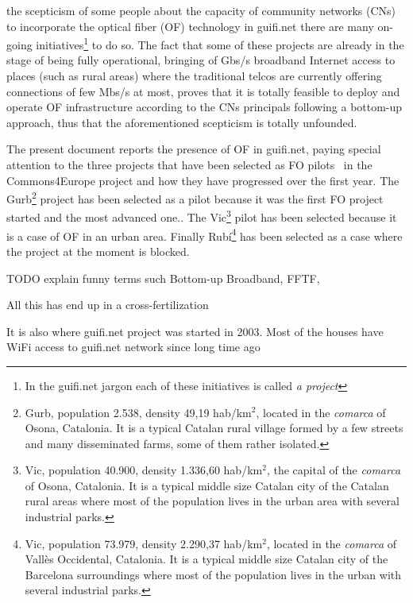  the scepticism of some people about the capacity of community networks (CNs) to incorporate the optical fiber (OF) technology in guifi.net there are many on-going initiatives\footnote{In the guifi.net jargon each of these initiatives is called \emph{a project}} to do so. The fact that some of these projects are already in the stage of being fully operational, bringing of Gbs/s broadband Internet access to places (such as rural areas) where the traditional telcos are currently offering connections of few Mbs/s at most, proves that it is totally feasible to deploy and operate OF infrastructure according to the CNs principals following a bottom-up approach, thus that the aforementioned scepticism is totally unfounded.

The present document reports the presence of OF in guifi.net, paying special attention to the three projects that have been selected as FO pilots~\cite{barcelo2012bub} in the Commons4Europe project and how they have progressed over the first year. The Gurb\footnote{Gurb, population 2.538, density 49,19 hab/km$^{2}$, located in the \emph{comarca} of Osona, Catalonia. It is a typical Catalan rural village formed by a few streets and many disseminated farms, some of them rather isolated.} project has been selected as a pilot because it was the first FO project started and the most advanced one.. The Vic\footnote{Vic, population 40.900, density 1.336,60 hab/km$^{2}$, the capital of the \emph{comarca} of Osona, Catalonia. It is a typical middle size Catalan city of the Catalan rural areas where most of the population lives in the urban area with several industrial parks.} pilot has been selected because it is a case of OF in an urban area. Finally Rub\'{i}\footnote{Vic, population 73.979, density 2.290,37 hab/km$^{2}$, located in the \emph{comarca} of Vall\`{e}s Occidental, Catalonia. It is a typical middle size Catalan city of the Barcelona surroundings where most of the population lives in the urban with several industrial parks.} has been selected as a case where the project at the moment is blocked.



TODO explain funny terms such Bottom-up Broadband, FFTF,

 All this has end up in a cross-fertilization 


 It is also where guifi.net project was started in 2003. Most of the houses have WiFi access to guifi.net network since long time ago

%
